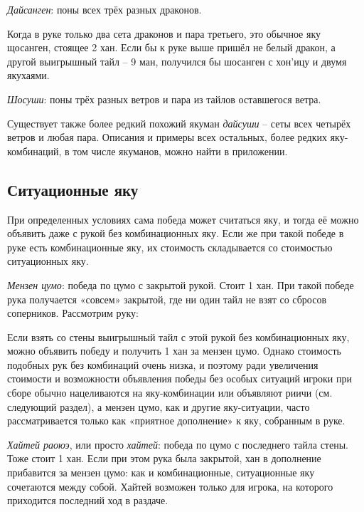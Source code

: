 \textit{Дайсанген}: поны всех трёх разных драконов.

\hfill {}

Когда в руке только два сета драконов и пара третьего, это обычное яку щосанген, стоящее 2 хан. Если бы к руке выше пришёл не белый дракон, а другой выигрышный тайл – 9 ман, получился бы шосанген с хон'ицу и двумя якухаями.

\textit{Шосуши}: поны трёх разных ветров и пара из тайлов оставшегося ветра.

\hfill {}

Существует также более редкий похожий якуман \textit{дайсуши} – сеты всех четырёх ветров и любая пара. Описания и примеры всех остальных, более редких яку-комбинаций, в том числе якуманов, можно найти в приложении. 

\subsection{Ситуационные яку}

При определенных условиях сама победа может считаться яку, и тогда её можно объявить даже с рукой без комбинационных яку. Если же при такой победе в руке есть комбинационные яку, их стоимость складывается со стоимостью ситуационных яку.

\textit{Мензен цумо}: победа по цумо с закрытой рукой. Стоит 1 хан. При такой победе рука получается «совсем» закрытой, где ни один тайл не взят со сбросов соперников. Рассмотрим руку:


Если взять со стены выигрышный тайл с этой рукой без комбинационных яку, можно объявить победу и получить 1 хан за мензен цумо. Однако стоимость подобных рук без комбинаций очень низка, и поэтому ради увеличения стоимости и возможности объявления победы без особых ситуаций игроки при сборе обычно нацеливаются на яку-комбинации или объявляют риичи (см. следующий раздел), а мензен цумо, как и другие яку-ситуации, часто рассматривается только как «приятное дополнение» к яку, собранным в руке.

\textit{Хайтей раоюэ}, или просто \textit{хайтей}: победа по цумо с последнего тайла стены. Тоже стоит 1 хан. Если при этом рука была закрытой, хан в дополнение прибавится за мензен цумо: как и комбинационные, ситуационные яку сочетаются между собой. Хайтей возможен только для игрока, на которого приходится последний ход в раздаче.

